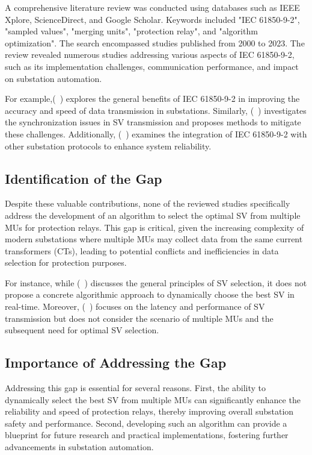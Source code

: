 A comprehensive literature review was conducted using databases such as IEEE Xplore, ScienceDirect, and Google Scholar. Keywords included "IEC 61850-9-2", "sampled values", "merging units", "protection relay", and "algorithm optimization". The search encompassed studies published from 2000 to 2023. The review revealed numerous studies addressing various aspects of IEC 61850-9-2, such as its implementation challenges, communication performance, and impact on substation automation.

For example,(~\cite{AbbReport2010}) explores the general benefits of IEC 61850-9-2 in improving the accuracy and speed of data transmission in substations. Similarly, (~\cite{baumgartner2024iec}) investigates the synchronization issues in SV transmission and proposes methods to mitigate these challenges. Additionally, (~\cite{chen2016performance})  examines the integration of IEC 61850-9-2 with other substation protocols to enhance system reliability.

\subsection{Identification of the Gap}

Despite these valuable contributions, none of the reviewed studies specifically address the development of an algorithm to select the optimal SV from multiple MUs for protection relays. This gap is critical, given the increasing complexity of modern substations where multiple MUs may collect data from the same current transformers (CTs), leading to potential conflicts and inefficiencies in data selection for protection purposes.

For instance, while (~\cite{IEC61850_SEL_9_2}) discusses the general principles of SV selection, it does not propose a concrete algorithmic approach to dynamically choose the best SV in real-time. Moreover, (~\cite{galkin2024microcomputer}) focuses on the latency and performance of SV transmission but does not consider the scenario of multiple MUs and the subsequent need for optimal SV selection.

\subsection{Importance of Addressing the Gap}

Addressing this gap is essential for several reasons. First, the ability to dynamically select the best SV from multiple MUs can significantly enhance the reliability and speed of protection relays, thereby improving overall substation safety and performance. Second, developing such an algorithm can provide a blueprint for future research and practical implementations, fostering further advancements in substation automation.

